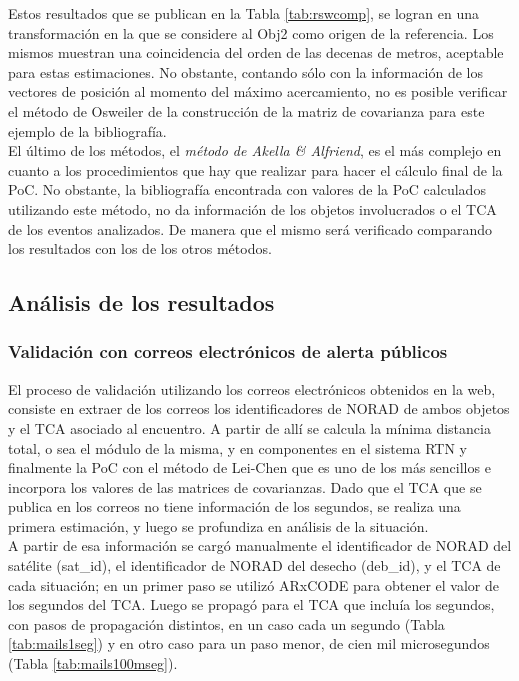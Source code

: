 Estos resultados que se publican en la Tabla \ref{tab:rswcomp}, se logran en una transformaci\'on en la que se considere al Obj2 como origen de la referencia. Los mismos muestran una coincidencia del orden de las decenas de metros, aceptable para estas estimaciones.
No obstante, contando s\'olo con la informaci\'on de los vectores de posici\'on al momento del m\'aximo acercamiento, no es posible verificar el m\'etodo de Osweiler de la construcci\'on de la matriz de covarianza para este ejemplo de la bibliograf\'ia.\\

El \'ultimo de los m\'etodos, el {\it{m\'etodo de Akella \& Alfriend}}, es el m\'as complejo en cuanto a los procedimientos que hay que realizar para hacer el c\'alculo final de la PoC. No obstante, la bibliograf\'ia encontrada con valores de la PoC calculados utilizando este m\'etodo, no da informaci\'on de los objetos involucrados o el TCA de los eventos analizados. De manera que el mismo ser\'a verificado comparando los resultados con los de los otros m\'etodos.

\subsection*{An\'alisis de los resultados}

\subsubsection*{Validaci\'on con correos electr\'onicos de alerta p\'ublicos}

El proceso de validaci\'on utilizando los correos electr\'onicos obtenidos en la web, consiste en extraer de los correos los identificadores de NORAD de ambos objetos y el TCA asociado al encuentro. A partir de all\'i se calcula la m\'inima distancia total, o sea el m\'odulo de la misma, y  en componentes en el sistema RTN y finalmente la PoC con el m\'etodo de Lei-Chen que es uno de los m\'as sencillos e incorpora los valores de las matrices de covarianzas.
Dado que el TCA que se publica en los correos no tiene informaci\'on de los segundos, se realiza una primera estimaci\'on, y luego se profundiza en an\'alisis de la situaci\'on.\\

A partir de esa informaci\'on se carg\'o manualmente el identificador de NORAD del sat\'elite (sat\_id), el identificador de NORAD del desecho (deb\_id), y el TCA de cada situaci\'on; en un primer paso se utiliz\'o ARxCODE para obtener el valor de los segundos del TCA. Luego se propag\'o para el TCA que inclu\'ia los segundos, con pasos de propagaci\'on distintos, en un caso cada un segundo (Tabla \ref{tab:mails1seg}) y en otro caso para un paso menor, de cien mil microsegundos (Tabla \ref{tab:mails100mseg}).\\

